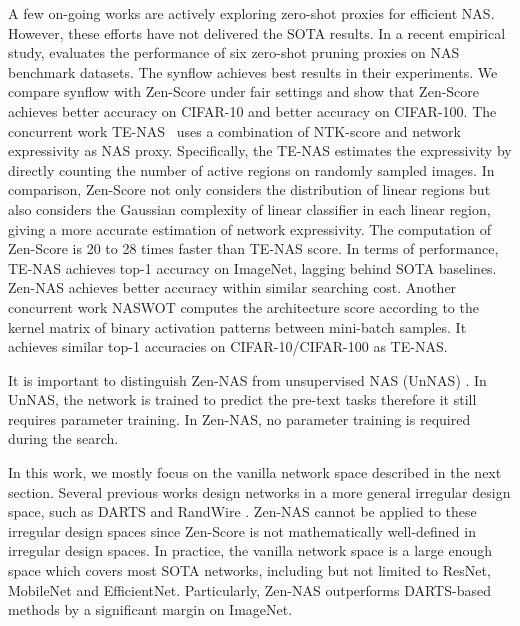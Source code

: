 \documentclass{article}
\begin{document}
A few on-going works are actively exploring zero-shot proxies for efficient NAS. However, these efforts have not delivered the SOTA results. In a recent empirical study, \cite{abdelfattahZeroCostProxiesLightweight2021} evaluates the performance of six zero-shot pruning proxies on NAS benchmark datasets. The synflow \cite{tanakaPruningNeuralNetworks2020} achieves best results in their experiments. We compare synflow with Zen-Score under fair settings and show that Zen-Score achieves  better accuracy on CIFAR-10 and  better accuracy on CIFAR-100. The concurrent work TE-NAS~\cite{chen2021neural} uses  a combination of NTK-score and network expressivity as NAS proxy. Specifically, the TE-NAS estimates the expressivity by directly counting the number of active regions  on randomly sampled images. In comparison, Zen-Score not only considers the distribution of linear regions but also considers the Gaussian complexity of linear classifier in each linear region, giving a more accurate estimation of network expressivity. 
The computation of Zen-Score is 20 to 28 times faster than TE-NAS score. In terms of performance, TE-NAS achieves  top-1 accuracy on ImageNet, lagging behind SOTA baselines. Zen-NAS achieves  better accuracy within similar searching cost. Another concurrent work NASWOT \cite{mellorNeuralArchitectureSearch2021a} computes the architecture score according to the kernel matrix of binary activation patterns between mini-batch samples. It achieves similar top-1 accuracies on CIFAR-10/CIFAR-100 as TE-NAS.

It is important to distinguish Zen-NAS from unsupervised NAS (UnNAS) \cite{liuAreLabelsNecessary2020a}. In UnNAS, the network is trained to predict the pre-text tasks therefore it still requires parameter training. In Zen-NAS, no parameter training is required during the search.

In this work, we mostly focus on the vanilla network space described in the next section. Several previous works design networks in a more general irregular design space, such as DARTS \cite{liuDARTSDifferentiableArchitecture2019} and RandWire \cite{xieExploringRandomlyWired2019}. Zen-NAS cannot be applied to these irregular design spaces since Zen-Score is not mathematically well-defined in irregular design spaces. In practice, the vanilla network space is a large enough space which covers most SOTA networks, including but not limited to ResNet, MobileNet and EfficientNet. Particularly, Zen-NAS outperforms DARTS-based methods by a significant margin on ImageNet.
\end{document}
